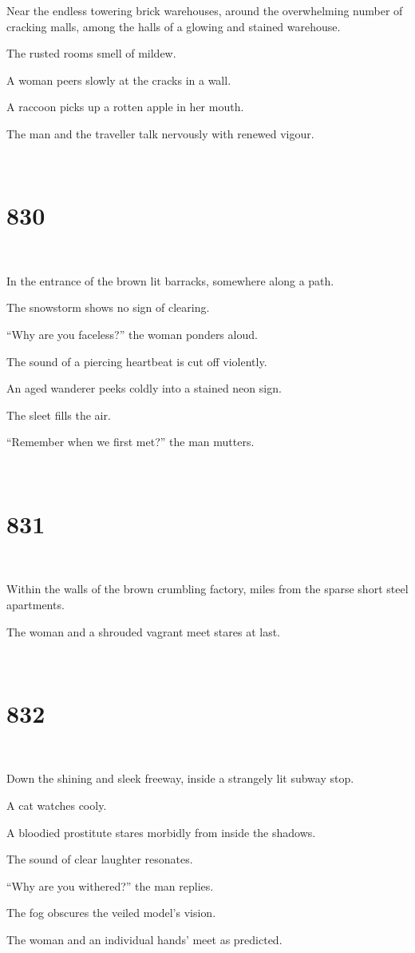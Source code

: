 \documentclass{report}
\begin{document}
Near the endless towering brick warehouses, around the overwhelming number of cracking malls, among the halls of a glowing and stained warehouse.

The rusted rooms smell of mildew.

A woman peers slowly at the cracks in a wall.

A raccoon picks up a rotten apple in her mouth.

The man and the traveller talk nervously with renewed vigour.

~
\chapter*{830}
~

In the entrance of the brown lit barracks, somewhere along a path.

The snowstorm shows no sign of clearing.

``Why are you faceless?'' the woman ponders aloud.

The sound of a piercing heartbeat is cut off violently.

An aged wanderer peeks coldly into a stained neon sign.

The sleet fills the air.

``Remember when we first met?'' the man mutters.

~
\chapter*{831}
~

Within the walls of the brown crumbling factory, miles from the sparse short steel apartments.

The woman and a shrouded vagrant meet stares at last.

~
\chapter*{832}
~

Down the shining and sleek freeway, inside a strangely lit subway stop.

A cat watches cooly.

A bloodied prostitute stares morbidly from inside the shadows.

The sound of clear laughter resonates.

``Why are you withered?'' the man replies.

The fog obscures the veiled model's vision.

The woman and an individual hands' meet as predicted.
\end{document}
